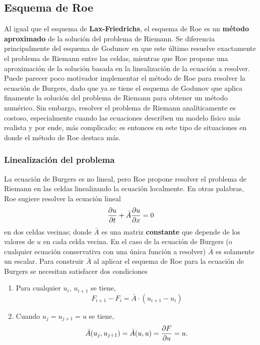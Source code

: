 \documentclass[12pt]{article}
\begin{document}
 	 \subsection{Esquema de Roe}
 	Al igual que el esquema de \textbf{Lax-Friedrichs}, el esquema de Roe es un \textbf{método aproximado} de la solución del problema de Riemann. Se diferencia principalmente del esquema de Godunov en que este último resuelve exactamente el problema de Riemann entre las celdas, mientras que Roe propone una aproximación de la solución basada en la linealización de la ecuación a resolver. Puede parecer poco motivador implementar el método de Roe para resolver la ecuación de Burgers, dado que ya se tiene el esquema de Godunov que aplica finamente la solución del problema de Riemann para obtener un método numérico. Sin embargo, resolver el problema de Riemann analíticamente es costoso, especialmente cuando las ecuaciones describen un modelo físico más realista y por ende, más complicado; es entonces en este tipo de situaciones en donde el método de Roe destaca más.
	
	\subsubsection{Linealización del problema}
	La ecuación de Burgers es no lineal, pero Roe propone resolver el problema de Riemann en las celdas linealizando la ecuación localmente. En otras palabras, Roe sugiere resolver la ecuación lineal
	\begin{equation}
		\pdv{u}{t} + \bar{A} \pdv{u}{x} = 0
		\label{eq:roelineal}
	\end{equation}
	en dos celdas vecinas; donde $\bar{A}$ es una matriz \textbf{constante} que depende de los valores de $u$ en cada celda vecina. En el caso de la ecuación de Burgers (o cualquier ecuación conservativa con una única función a resolver) $\bar{A}$ es solamente un escalar. Para construir $\bar{A}$ al aplicar el esquema de Roe para la ecuación de Burgers se necesitan satisfacer dos condiciones
	
	\begin{enumerate}
		\item Para cualquier $u_{i}$, $u_{i+1}$ se tiene,
		\begin{equation}
				F_{i+1}-F_{i} = \bar{A} \cdot (u_{i+1} - u_{i})
		\end{equation}
		\item Cuando $u_{j} = u_{j+1} = u$ se tiene,
		\begin{equation}
				\bar{A}(u_j, u_{j+1}) = \bar{A}(u,u) = \pdv{F}{u} = u.
		\end{equation}
	\end{enumerate}
		
\end{document}
